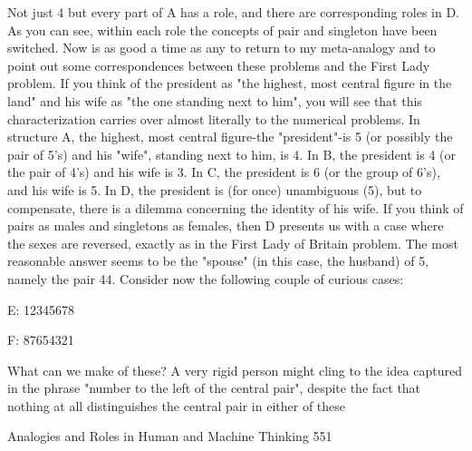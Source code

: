         Not just 4 but every part of A has a role, and there are corresponding roles in
D. As you can see, within each role the concepts of pair and singleton have been
switched.
        Now is as good a time as any to return to my meta-analogy and to point out
some correspondences between these problems and the First Lady problem. If you
think of the president as "the highest, most central figure in the land" and his wife as
"the one standing next to him", you will see that this characterization carries over
almost literally to the numerical problems. In structure A, the highest, most central
figure-the "president"-is 5 (or possibly the pair of 5's) and his "wife", standing next to
him, is 4. In B, the president is 4 (or the pair of 4's) and his wife is 3. In C, the
president is 6 (or the group of 6's), and his wife is 5. In D, the president is (for once)
unambiguous (5), but to compensate, there is a dilemma concerning the identity of his
wife. If you think of pairs as males and singletons as females, then D presents us with
a case where the sexes are reversed, exactly as in the First Lady of Britain problem.
The most reasonable answer seems to be the "spouse" (in this case, the husband) of 5,
namely the pair 44.
        Consider now the following couple of curious cases:

               E: 12345678

               F: 87654321

       What can we make of these? A very rigid person might cling to the idea
captured in the phrase "number to the left of the central pair", despite the fact that
nothing at all distinguishes the central pair in either of these




Analogies and Roles in Human and Machine Thinking                                     551

